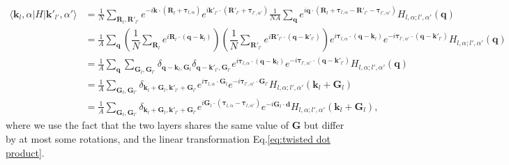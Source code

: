 \begin{align}
    \langle\bm k_l,\alpha|H|\bm k'_{l'},\alpha'\rangle & =\frac{1}{N}\sum_{\bm R_l,\bm R'_{l'}}e^{-i\bm k\cdot(\bm R_l+\bm\tau_{l,\alpha})}e^{i\bm k'_{l'}\cdot(\bm R'_{l'}+\bm\tau_{l',\alpha'})}\frac{1}{NA}\sum_{\bm q}e^{i\bm q\cdot(\bm R_l+\bm\tau_{l,\alpha}-\bm R'_{l'}-\bm\tau_{l',\alpha'})}H_{l,\alpha;l',\alpha'}(\bm q)                  \nonumber                    \\
                                                       & = \frac{1}{A}\sum_{\bm q}\left(\dfrac{1}{N}\sum_{\bm R_l}e^{i\bm R_l\cdot(\bm q-\bm k_l)}\right)\left(\dfrac{1}{N}\sum_{\bm R'_{l'}}e^{i\bm R'_{l'}\cdot(\bm q-\bm k'_{l'})}\right)e^{i\bm\tau_{l,\alpha}\cdot(\bm q-\bm k_l)} e^{-i\bm\tau_{l',\alpha'}\cdot(\bm q-\bm k'_{l'})}H_{l,\alpha;l',\alpha'}(\bm q) \nonumber \\
                                                       & =\frac{1}{A}\sum_{\bm q}\sum_{\bm G_l,\bm G_{l'}}\delta_{\bm q-\bm k_l,\bm G_l}\delta_{\bm q-\bm k'_{l'},\bm G_{l'}}e^{i\bm\tau_{l,\alpha}\cdot(\bm q-\bm k_l)} e^{-i\bm\tau_{l',\alpha'}\cdot(\bm q-\bm k'_{l'})}H_{l,\alpha;l',\alpha'}(\bm q)                                         \nonumber                        \\
                                                       & = \frac{1}{A}\sum_{\bm G_l,\bm G_{l'}}\delta_{\bm k_l+\bm G_l,\bm k'_{l'}+\bm G_{l'}} e^{i\bm\tau_{l,\alpha}\cdot\bm G_l}e^{-i\bm\tau_{l',\alpha'}\cdot\bm G_{l'}}H_{l,\alpha;l',\alpha'}(\bm k_l+\bm G_l)\nonumber                                                                                                       \\
                                                       & = \frac{1}{A}\sum_{\bm G_l,\bm G_{l'}}\delta_{\bm k_l+\bm G_l,\bm k'_{l'}+\bm G_{l'}} e^{i\bm G_l\cdot(\bm\tau_{l,\alpha}-\bm\tau_{l,\alpha'})}e^{-i\bm G_l\cdot\bm d} H_{l,\alpha;l',\alpha'}(\bm k_l+\bm G_l),\label{eq:two-center_approximation}
\end{align}
where we use the fact that the two layers shares the same value of $\bm G$ but differ by at most some rotations, and the linear transformation Eq.\eqref{eq:twisted dot product}.

